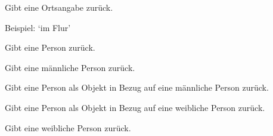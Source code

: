 \documentclass[a4paper,12pt,oneside]{sphinxmanual}
\begin{document}

\begin{fulllineitems}
\label{funktionen:pyzufall.ort}
Gibt eine Ortsangabe zurück.

Beispiel: `im Flur'

\end{fulllineitems}


\begin{fulllineitems}
\label{funktionen:pyzufall.person}
Gibt eine Person zurück.

\end{fulllineitems}


\begin{fulllineitems}
\label{funktionen:pyzufall.person_m}
Gibt eine männliche Person zurück.

\end{fulllineitems}


\begin{fulllineitems}
\label{funktionen:pyzufall.person_objekt_m}
Gibt eine Person als Objekt in Bezug auf eine männliche Person zurück.

\end{fulllineitems}


\begin{fulllineitems}
\label{funktionen:pyzufall.person_objekt_w}
Gibt eine Person als Objekt in Bezug auf eine weibliche Person zurück.

\end{fulllineitems}


\begin{fulllineitems}
\label{funktionen:pyzufall.person_w}
Gibt eine weibliche Person zurück.

\end{fulllineitems}
\end{document}
